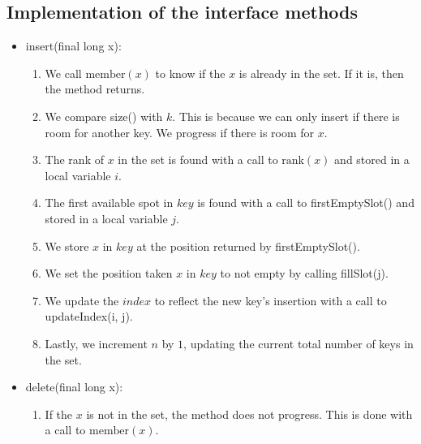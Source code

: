 \subsection{Implementation of the interface methods} \label{sec:binaryRankInterfaceImplementation}
\begin{itemize}
    \item \label{sec:binaryRankInsert}
    {\ttfamily insert(final long x)}:
    \begin{enumerate}
        \item
        We call $\text{member}(x)$ to know if the $x$ is already in the set. If it is, then the method returns.
        
        \item
        We compare {\ttfamily size()} with $k$. This is because we can only insert if there is room for another key. We progress if there is room for $x$.
        
        \item
        The rank of $x$ in the set is found with a call to  $\text{rank}(x)$ and stored in a local variable $i$.
        
        \item
        The first available spot in $key$ is found with a call to {\ttfamily firstEmptySlot()} and stored in a local variable $j$.
        
        \item
        We store $x$ in $key$ at the position returned by {\ttfamily firstEmptySlot()}.
        
        \item
        We set the position taken $x$ in $key$ to not empty by calling {\ttfamily fillSlot(j)}.
        
        \item
        We update the $index$ to reflect the new key's insertion with a call to {\ttfamily updateIndex(i, j)}.
        
        \item
        Lastly, we increment $n$ by $1$, updating the current total number of keys in the set.
    \end{enumerate}
    
    \item
    {\ttfamily delete(final long x)}:
    \begin{enumerate}
        \item
        If the $x$ is not in the set, the method does not progress. This is done with a call to $\text{member}(x)$.
        

\end{enumerate}
\end{itemize}
